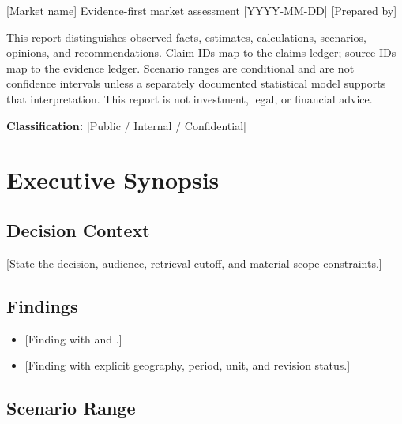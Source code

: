 \documentclass[11pt,letterpaper]{report}
\newcommand{\reporttitle}{[Market name]}
\newcommand{\reportsubtitle}{Evidence-first market assessment}
\newcommand{\retrievalcutoff}{[YYYY-MM-DD]}
\newcommand{\reportauthor}{[Prepared by]}
\newcommand{\reportclassification}{[Public / Internal / Confidential]}
\begin{document}
\makemarketreporttitle
  {\reporttitle}
  {\reportsubtitle}
  {\retrievalcutoff}
  {\reportauthor}


\begin{calloutbox}
This report distinguishes observed facts, estimates, calculations, scenarios,
opinions, and recommendations. Claim IDs map to the claims ledger; source IDs
map to the evidence ledger. Scenario ranges are conditional and are not
confidence intervals unless a separately documented statistical model supports
that interpretation. This report is not investment, legal, or financial advice.
\end{calloutbox}

\textbf{Classification:} \reportclassification

\tableofcontents
\clearpage
{}

\chapter{Executive Synopsis}

\section{Decision Context}
[State the decision, audience, retrieval cutoff, and material scope constraints.]

\section{Findings}
\begin{evidencebox}
\begin{itemize}
  \item {[Finding with  and .]}
  \item {[Finding with explicit geography, period, unit, and revision status.]}
\end{itemize}
\end{evidencebox}

\section{Scenario Range}
\begin{calculationbox}
\end{calculationbox}
\end{document}
